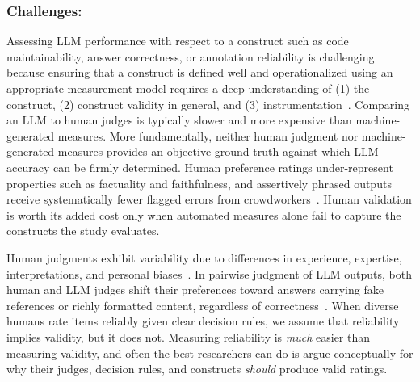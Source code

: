 \documentclass[smallextended]{svjour3}
\newcommand{\guidelinesubsubsection}[1]{\subsubsection{\bfseries #1:}}
\newcommand{\guidelinesubsubsection}[1]{\subsubsection{#1}}
\begin{document}
\guidelinesubsubsection{Challenges}

Assessing LLM performance with respect to a construct such as code maintainability, answer correctness, or annotation reliability is challenging because ensuring that a construct is defined well and operationalized using an appropriate measurement model requires a deep understanding of (1) the construct, (2) construct validity in general, and (3) instrumentation~\cite{DBLP:journals/tse/SjobergB23,DBLP:books/sp/24/RalphKAA24}. Comparing an LLM to human judges is typically slower and more expensive than machine-generated measures. More fundamentally, neither human judgment nor machine-generated measures provides an objective ground truth against which LLM accuracy can be firmly determined. Human preference ratings under-represent properties such as factuality and faithfulness, and assertively phrased outputs receive systematically fewer flagged errors from crowdworkers~\cite{DBLP:conf/iclr/HoskingBB24}. Human validation is worth its added cost only when automated measures alone fail to capture the constructs the study evaluates.

Human judgments exhibit variability due to differences in experience, expertise, interpretations, and personal biases~\cite{DBLP:journals/pacmhci/McDonaldSF19}. In pairwise judgment of LLM outputs, both human and LLM judges shift their preferences toward answers carrying fake references or richly formatted content, regardless of correctness~\cite{DBLP:conf/emnlp/ChenCLJW24}. When diverse humans rate items reliably given clear decision rules, we assume that reliability implies validity, but it does not. Measuring reliability is \textit{much} easier than measuring validity, and often the best researchers can do is argue conceptually for why their judges, decision rules, and constructs \textit{should} produce valid ratings.
\end{document}
